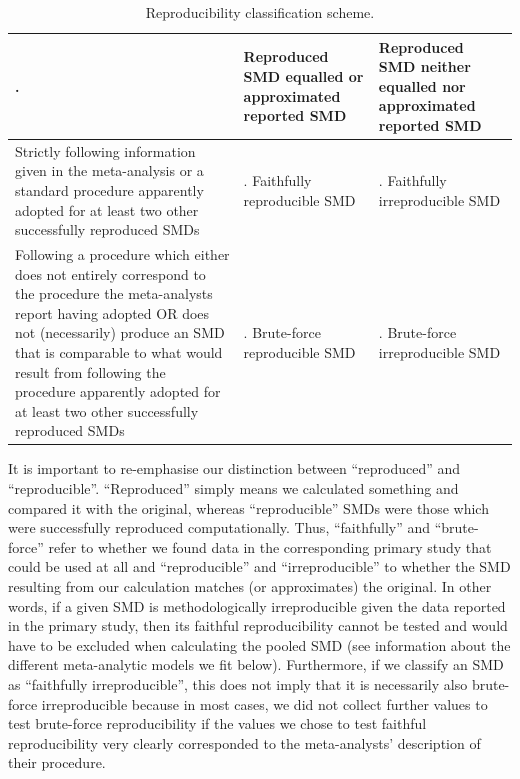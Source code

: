 \documentclass[
  man,floatsintext]{apa6}
\begin{document}
\singlespacing
\begingroup\fontsize{10}{12}\selectfont

\begin{longtable}[t]{>{\raggedright\arraybackslash}p{18em}>{\raggedright\arraybackslash}p{12em}>{\raggedright\arraybackslash}p{12em}}
\caption{\label{tab:table4}Reproducibility classification scheme.}\\
\toprule
. & Reproduced SMD equalled or approximated reported SMD & Reproduced SMD neither equalled nor approximated reported SMD\\
\midrule
Strictly following information given in the meta-analysis or a standard procedure apparently adopted for at least two other successfully reproduced SMDs & 1. Faithfully reproducible SMD & 2. Faithfully irreproducible SMD\\
\midrule
Following a procedure which either does not entirely correspond to the procedure the meta-analysts report having adopted OR does not (necessarily) produce an SMD that is comparable to what would result from following the procedure apparently adopted for at least two other successfully reproduced SMDs & 3. Brute-force reproducible SMD & 4. Brute-force irreproducible SMD\\
\bottomrule
\end{longtable}
\endgroup{}
\doublespacing

It is important to re-emphasise our distinction between ``reproduced'' and ``reproducible''. ``Reproduced'' simply means we calculated something and compared it with the original, whereas ``reproducible'' SMDs were those which were successfully reproduced computationally. Thus, ``faithfully'' and ``brute-force'' refer to whether we found data in the corresponding primary study that could be used at all and ``reproducible'' and ``irreproducible'' to whether the SMD resulting from our calculation matches (or approximates) the original. In other words, if a given SMD is methodologically irreproducible given the data reported in the primary study, then its faithful reproducibility cannot be tested and would have to be excluded when calculating the pooled SMD (see information about the different meta-analytic models we fit below). Furthermore, if we classify an SMD as ``faithfully irreproducible'', this does not imply that it is necessarily also brute-force irreproducible because in most cases, we did not collect further values to test brute-force reproducibility if the values we chose to test faithful reproducibility very clearly corresponded to the meta-analysts' description of their procedure.
\end{document}
